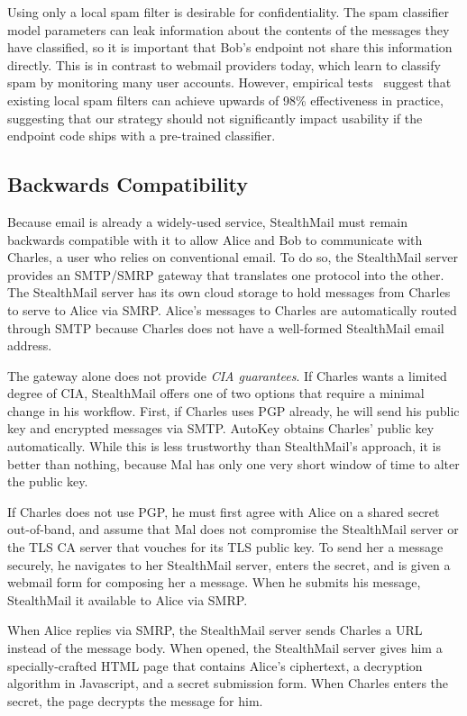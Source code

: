 Using only a local spam filter is desirable for confidentiality.  The spam classifier model parameters can leak information about the contents of the messages they have classified, so it is important that Bob’s endpoint not share this information directly.  This is in contrast to webmail providers today, which learn to classify spam by monitoring many user accounts.  However, empirical tests~\cite{local-spam-filter-eval} suggest that existing local spam filters can achieve upwards of 98\% effectiveness in practice, suggesting that our strategy should not significantly impact usability if the endpoint code ships with a pre-trained classifier.

\subsection{Backwards Compatibility}
Because email is already a widely-used service, StealthMail must remain backwards compatible with it to allow Alice and Bob to communicate with Charles, a user who relies on conventional email.  To do so, the StealthMail server provides an SMTP/SMRP gateway that translates one protocol into the other.  The StealthMail server has its own cloud storage to hold messages from Charles to serve to Alice via SMRP.  Alice’s messages to Charles are automatically routed through SMTP because Charles does not have a well-formed StealthMail email address.

The gateway alone does not provide \emph{CIA guarantees}.  If Charles wants a limited degree of CIA, StealthMail offers one of two options that require a minimal change in his workflow.  First, if Charles uses PGP already, he will send his public key and encrypted messages via SMTP.  AutoKey obtains Charles’ public key automatically.  While this is less trustworthy than StealthMail’s approach, it is better than nothing, because Mal has only one very short window of time to alter the public key.

If Charles does not use PGP, he must first agree with Alice on a shared secret out-of-band, and assume that Mal does not compromise the StealthMail server or the TLS CA server that vouches for its TLS public key.  To send her a message securely, he navigates to her StealthMail server, enters the secret, and is given a webmail form for composing her a message.  When he submits his message, StealthMail it available to Alice via SMRP.

When Alice replies via SMRP, the StealthMail server sends Charles a URL instead of the message body.  When opened, the StealthMail server gives him a specially-crafted HTML page that contains Alice’s ciphertext, a decryption algorithm in Javascript, and a secret submission form.  When Charles enters the secret, the page decrypts the message for him.
